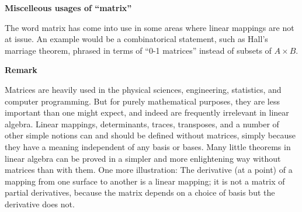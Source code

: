 \documentclass[12pt]{article}
\begin{document}
\textbf{Miscelleous usages of ``matrix''}

The word matrix has come into use in some areas where linear mappings
are not at issue. An example would be a combinatorical statement,
such as Hall's marriage theorem, phrased in terms of ``0-1 matrices''
instead of subsets of $A\times B$.

\textbf{Remark}

Matrices are heavily used in the physical sciences, engineering,
statistics, and computer programming. But for purely mathematical purposes,
they are less important than one might expect, and indeed are frequently
irrelevant in linear algebra. Linear mappings, determinants, traces,
transposes, and a number of other simple notions can and should be
defined without matrices, simply because they have a meaning independent
of any basis or bases.
Many little theorems in linear algebra can be proved in a simpler
and more enlightening way without matrices than with them.
One more illustration: The derivative (at a point)
of a mapping from one surface to another is a linear mapping; it is not a
matrix of partial derivatives, because the matrix depends on a choice
of basis but the derivative does not.
\end{document}

